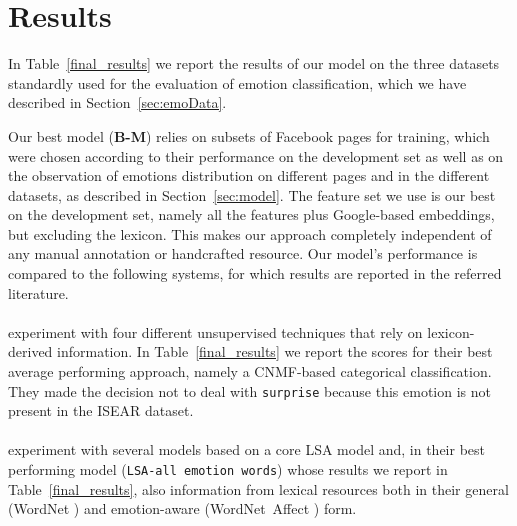 \documentclass[11pt]{article}
\begin{document}


\section{Results}
\label{sec:evaluation}
In Table~\ref{final_results} we report the results of our model on the three datasets standardly used for the evaluation of emotion classification, which we have described in Section~\ref{sec:emoData}. 


Our best model (\textbf{B-M}) relies on subsets of Facebook pages for training, which were chosen according to their performance on the development set as well as on the observation of emotions distribution on different pages and in the different datasets, as described in Section~\ref{sec:model}. The feature set we use is our best on the development set, namely 
all the features plus Google-based embeddings, but excluding the lexicon. This makes our approach completely independent of any manual annotation or handcrafted resource. 
Our model's performance is compared to the following systems, for which results are reported in the referred literature. 


\paragraph{} experiment with four different unsupervised techniques that rely on lexicon-derived information. In Table~\ref{final_results} we report the scores for their best average performing approach, namely a CNMF-based categorical classification. They made the decision not to deal with \texttt{surprise} because this emotion is not present in the ISEAR dataset.


\paragraph{} experiment with several models based on a core LSA model and, in their best performing model (\texttt{LSA-all emotion words}) whose results we report in Table~\ref{final_results}, also information from lexical resources both in their general (WordNet \cite{wordnet}) and emotion-aware (WordNet~Affect \cite{strapparava2004wordnet}) form. 
\end{document}
